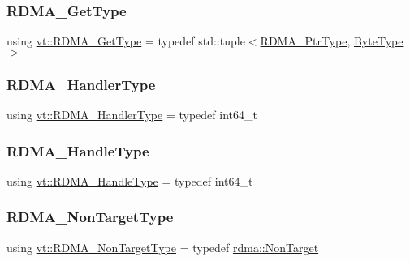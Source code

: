\mbox{\label{namespacevt_a1cab7f4860f65a49ad2c042d6240f288}} 
\subsubsection{\texorpdfstring{R\+D\+M\+A\+\_\+\+Get\+Type}{RDMA\_GetType}}
{\footnotesize\ttfamily using \hyperlink{namespacevt_a1cab7f4860f65a49ad2c042d6240f288}{vt\+::\+R\+D\+M\+A\+\_\+\+Get\+Type} = typedef std\+::tuple$<$\hyperlink{namespacevt_a9e2c953286c7616f7c218e9951790776}{R\+D\+M\+A\+\_\+\+Ptr\+Type}, \hyperlink{namespacevt_aab8d55968084610ce3b17057981e9300}{Byte\+Type}$>$}

\mbox{\label{namespacevt_a9530efb893c0f3846e8ac5f0507e0f49}} 
\subsubsection{\texorpdfstring{R\+D\+M\+A\+\_\+\+Handler\+Type}{RDMA\_HandlerType}}
{\footnotesize\ttfamily using \hyperlink{namespacevt_a9530efb893c0f3846e8ac5f0507e0f49}{vt\+::\+R\+D\+M\+A\+\_\+\+Handler\+Type} = typedef int64\+\_\+t}

\mbox{\label{namespacevt_a10442579ec4e7ebef223818e64bcf908}} 
\subsubsection{\texorpdfstring{R\+D\+M\+A\+\_\+\+Handle\+Type}{RDMA\_HandleType}}
{\footnotesize\ttfamily using \hyperlink{namespacevt_a10442579ec4e7ebef223818e64bcf908}{vt\+::\+R\+D\+M\+A\+\_\+\+Handle\+Type} = typedef int64\+\_\+t}

\mbox{\label{namespacevt_ae5bd2866e5ee83f4d6a53e8730cd3202}} 
\subsubsection{\texorpdfstring{R\+D\+M\+A\+\_\+\+Non\+Target\+Type}{RDMA\_NonTargetType}}
{\footnotesize\ttfamily using \hyperlink{namespacevt_ae5bd2866e5ee83f4d6a53e8730cd3202}{vt\+::\+R\+D\+M\+A\+\_\+\+Non\+Target\+Type} = typedef \hyperlink{structvt_1_1rdma_1_1_non_target}{rdma\+::\+Non\+Target}}

